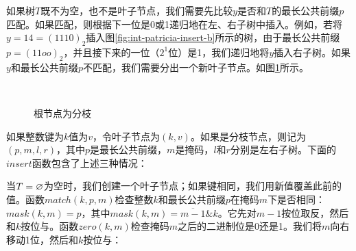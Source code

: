 \documentclass[b5paper]{ctexart}
\begin{document}
如果树$T$既不为空，也不是叶子节点，我们需要先比较$y$是否和$T$的最长公共前缀$p$匹配。如果匹配，则根据下一位是0或1递归地在左、右子树中插入。例如，若将$y = 14 = (1110)_2$插入图\ref{fig:int-patricia-insert-b}所示的树，由于最长公共前缀$p = (11oo)_2$，并且接下来的一位（$2^1$位）是1，我们递归地将$y$插入右子树。如果$y$和最长公共前缀$p$不匹配，我们需要分出一个新叶子节点。如图\ref{fig:int-patricia-insert-c}所示。

\begin{figure}[htbp]
  \centering
  \\
  \caption{根节点为分枝}
  \label{fig:int-patricia-insert-c}
\end{figure}

如果整数键为$k$值为$v$，令叶子节点为$(k, v)$。如果是分枝节点，则记为$(p, m, l, r)$，其中$p$是最长公共前缀，$m$是掩码，$l$和$r$分别是左右子树。下面的$insert$函数包含了上述三种情况：

\be
{}
\ee

当$T = \varnothing$为空时，我们创建一个叶子节点；如果键相同，我们用新值覆盖此前的值。函数$match(k, p, m)$检查整数$k$和最长公共前缀$p$在掩码$m$下是否相同：$mask(k, m) = p$，其中$mask(k, m) = \overline{m-1} \& k$。它先对$m - 1$按位取反，然后和$k$按位与。函数$zero(k, m)$检查掩码$m$之后的二进制位是0还是1。我们将$m$向右移动1位，然后和$k$按位与：
\end{document}

